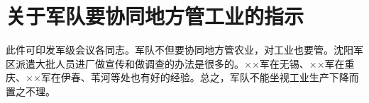 \section[关于军队要协同地方管工业的指示（一九六七年三月三日）]{关于军队要协同地方管工业的指示}


此件可印发军级会议各同志。军队不但要协同地方管农业，对工业也要管。沈阳军区派遣大批人员进厂做宣传和做调查的办法是很多的。××军在无锡、××军在重庆、××军在伊春、苇河等处也有好的经验。总之，军队不能坐视工业生产下降而置之不理。

